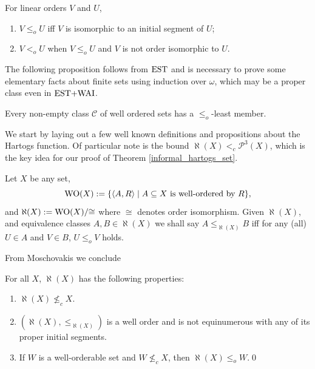 \begin{definition}
  For linear orders $V$ and $U$,
  \begin{enumerate}

  \item
    $V\leq_o U$ iff  $V$ is
    isomorphic to an initial segment of $U$;
  \item
    $V<_o U$ when  $V\leq_o U$ and  $V$ is not order isomorphic
    to $U$.
  \end{enumerate}
\end{definition}

The following proposition follows from $\mathrm{EST}$ and is necessary to prove some elementary facts about finite sets using induction over $\omega$, which may be a proper class even in $\text{EST+WAI}$.

\begin{prop}\label{class_wo}
  Every non-empty class $\mathcal{C}$ of well ordered sets has a $\leq_o$-least member.
\end{prop}

We start by laying out a few well known definitions and propositions about the Hartogs function. Of particular note is the bound $\aleph(X) <_c \mathcal{P}^{3}(X)$, which is the key idea for our proof of Theorem \ref{informal_hartogs_set}.

\begin{definition}\label{aleph}
	Let $X$ be any set,
	\[
	\mathrm{WO}(X):=\{\langle A,R\rangle \mid A\subseteq X \ \text{is well-ordered by}\ R\}, 
	\]
	and $\aleph(X):= \mathrm{WO}(X)/{\cong}$ where $\cong$ denotes order isomorphism.
	Given $\aleph(X)$, and equivalence classes $A,B \in\aleph(X)$ we shall say $A
        \leq_{\aleph(X)} B$ iff for any (all) $U\in A$ and $V\in B$, $U\leq_o V$
        holds.
\end{definition}

From Moschovakis \cite[Thm.~7.34]{Moscho} we conclude
\begin{lemma}\label{aleph2}
	For all $X$, $\aleph(X)$ has the following properties:
	\begin{enumerate}
		\item $\aleph(X)\nleq_c X$.
		\item $(\aleph(X),\leq_{\aleph(X)})$ is a well order and is not
                  equinumerous with any of its proper initial segments.
		\item If $W$ is a well-orderable set and $W \nleq_c X$, then $\aleph(X) \leq_o W$.\qed
	\end{enumerate}
\end{lemma}


